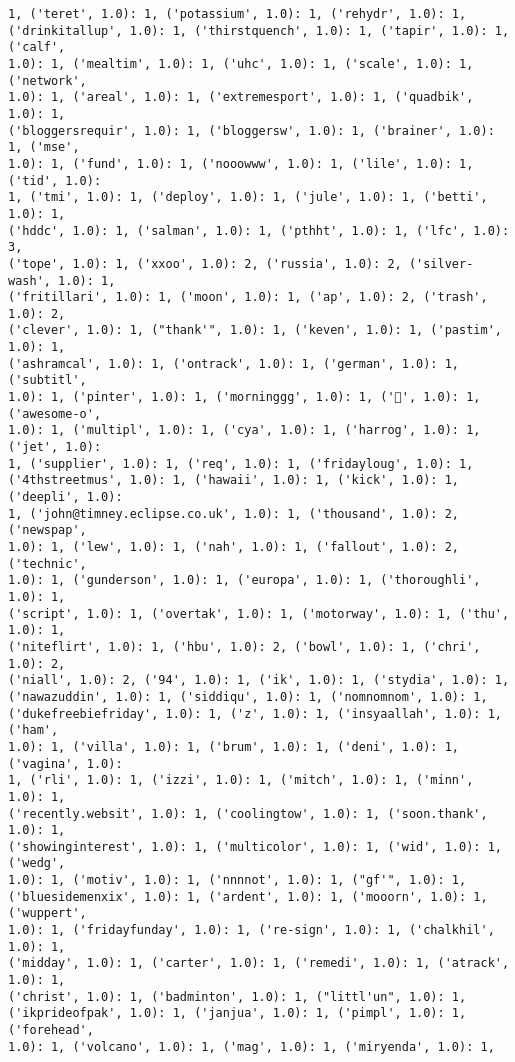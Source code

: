 \documentclass[11pt]{article}
\begin{document}
\begin{Verbatim}[commandchars=\\\{\}]
1, ('teret', 1.0): 1, ('potassium', 1.0): 1, ('rehydr', 1.0): 1,
('drinkitallup', 1.0): 1, ('thirstquench', 1.0): 1, ('tapir', 1.0): 1, ('calf',
1.0): 1, ('mealtim', 1.0): 1, ('uhc', 1.0): 1, ('scale', 1.0): 1, ('network',
1.0): 1, ('areal', 1.0): 1, ('extremesport', 1.0): 1, ('quadbik', 1.0): 1,
('bloggersrequir', 1.0): 1, ('bloggersw', 1.0): 1, ('brainer', 1.0): 1, ('mse',
1.0): 1, ('fund', 1.0): 1, ('nooowww', 1.0): 1, ('lile', 1.0): 1, ('tid', 1.0):
1, ('tmi', 1.0): 1, ('deploy', 1.0): 1, ('jule', 1.0): 1, ('betti', 1.0): 1,
('hddc', 1.0): 1, ('salman', 1.0): 1, ('pthht', 1.0): 1, ('lfc', 1.0): 3,
('tope', 1.0): 1, ('xxoo', 1.0): 2, ('russia', 1.0): 2, ('silver-wash', 1.0): 1,
('fritillari', 1.0): 1, ('moon', 1.0): 1, ('ap', 1.0): 2, ('trash', 1.0): 2,
('clever', 1.0): 1, ("thank'", 1.0): 1, ('keven', 1.0): 1, ('pastim', 1.0): 1,
('ashramcal', 1.0): 1, ('ontrack', 1.0): 1, ('german', 1.0): 1, ('subtitl',
1.0): 1, ('pinter', 1.0): 1, ('morninggg', 1.0): 1, ('🐶', 1.0): 1, ('awesome-o',
1.0): 1, ('multipl', 1.0): 1, ('cya', 1.0): 1, ('harrog', 1.0): 1, ('jet', 1.0):
1, ('supplier', 1.0): 1, ('req', 1.0): 1, ('fridayloug', 1.0): 1,
('4thstreetmus', 1.0): 1, ('hawaii', 1.0): 1, ('kick', 1.0): 1, ('deepli', 1.0):
1, ('john@timney.eclipse.co.uk', 1.0): 1, ('thousand', 1.0): 2, ('newspap',
1.0): 1, ('lew', 1.0): 1, ('nah', 1.0): 1, ('fallout', 1.0): 2, ('technic',
1.0): 1, ('gunderson', 1.0): 1, ('europa', 1.0): 1, ('thoroughli', 1.0): 1,
('script', 1.0): 1, ('overtak', 1.0): 1, ('motorway', 1.0): 1, ('thu', 1.0): 1,
('niteflirt', 1.0): 1, ('hbu', 1.0): 2, ('bowl', 1.0): 1, ('chri', 1.0): 2,
('niall', 1.0): 2, ('94', 1.0): 1, ('ik', 1.0): 1, ('stydia', 1.0): 1,
('nawazuddin', 1.0): 1, ('siddiqu', 1.0): 1, ('nomnomnom', 1.0): 1,
('dukefreebiefriday', 1.0): 1, ('z', 1.0): 1, ('insyaallah', 1.0): 1, ('ham',
1.0): 1, ('villa', 1.0): 1, ('brum', 1.0): 1, ('deni', 1.0): 1, ('vagina', 1.0):
1, ('rli', 1.0): 1, ('izzi', 1.0): 1, ('mitch', 1.0): 1, ('minn', 1.0): 1,
('recently.websit', 1.0): 1, ('coolingtow', 1.0): 1, ('soon.thank', 1.0): 1,
('showinginterest', 1.0): 1, ('multicolor', 1.0): 1, ('wid', 1.0): 1, ('wedg',
1.0): 1, ('motiv', 1.0): 1, ('nnnnot', 1.0): 1, ("gf'", 1.0): 1,
('bluesidemenxix', 1.0): 1, ('ardent', 1.0): 1, ('mooorn', 1.0): 1, ('wuppert',
1.0): 1, ('fridayfunday', 1.0): 1, ('re-sign', 1.0): 1, ('chalkhil', 1.0): 1,
('midday', 1.0): 1, ('carter', 1.0): 1, ('remedi', 1.0): 1, ('atrack', 1.0): 1,
('christ', 1.0): 1, ('badminton', 1.0): 1, ("littl'un", 1.0): 1,
('ikprideofpak', 1.0): 1, ('janjua', 1.0): 1, ('pimpl', 1.0): 1, ('forehead',
1.0): 1, ('volcano', 1.0): 1, ('mag', 1.0): 1, ('miryenda', 1.0): 1,

\end{Verbatim}
\end{document}
